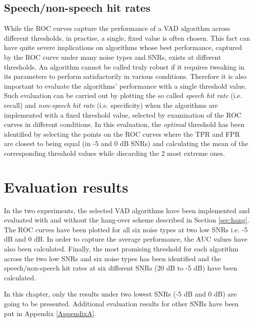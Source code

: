 \subsection{Speech/non-speech hit rates}

While the ROC curves capture the performance of a VAD algorithm across different thresholds, in practise, a single, fixed value is often chosen. This fact can have quite severe implications on algorithms whose best performance, captured by the ROC curve under many noise types and SNRs, exists at different thresholds. An algorithm cannot be called truly robust if it requires tweaking in its parameters to perform satisfactorily in various conditions. Therefore it is also important to evaluate the algorithms' performance with a single threshold value. Such evaluation can be carried out by plotting the so called \emph{speech hit rate} (i.e. recall) and \emph{non-speech hit rate} (i.e. specificity) when the algorithms are implemented with a fixed threshold value, selected by examination of the ROC curves in different conditions. In this evaluation, the \emph{optimal} threshold has been identified by selecting the points on the ROC curves where the TPR and FPR are closest to being equal (in -5 and 0 dB SNRs) and calculating the mean of the corresponding threshold values while discarding the 2 most extreme ones.


\section{Evaluation results}

In the two experiments, the selected VAD algorithms have been implemented and evaluated with and without the hang-over scheme described in Section \ref{sec:hang}. The ROC curves have been plotted for all six noise types at two low SNRs i.e. -5 dB and 0 dB. In order to capture the average performance, the AUC values have also been calculated. Finally, the most promising threshold for each algorithm across the two low SNRs and six noise types has been identified and the speech/non-speech hit rates at six different SNRs (20 dB to -5 dB) have been calculated.

In this chapter, only the results under two lowest SNRs (-5 dB and 0 dB) are going to be presented. Additional evaluation results for other SNRs have been put in Appendix \ref{AppendixA}.

